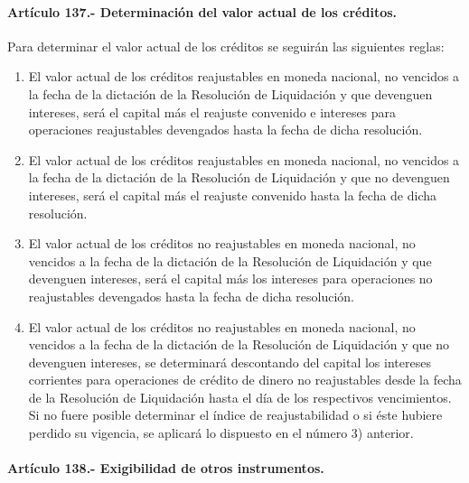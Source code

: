 \documentclass[
]{book}
\begin{document}
\hypertarget{artuxedculo-137.--determinaciuxf3n-del-valor-actual-de-los-cruxe9ditos.}{%
\paragraph*{Artículo 137.- Determinación del valor actual de los créditos.}\label{artuxedculo-137.--determinaciuxf3n-del-valor-actual-de-los-cruxe9ditos.}}

Para determinar el valor actual de los créditos se seguirán las siguientes reglas:

\begin{enumerate}
\def\labelenumi{\arabic{enumi})}
\item
  El valor actual de los créditos reajustables en moneda nacional, no vencidos a la fecha de la dictación de la Resolución de Liquidación y que devenguen intereses, será el capital más el reajuste convenido e intereses para operaciones reajustables devengados hasta la fecha de dicha resolución.
\item
  El valor actual de los créditos reajustables en moneda nacional, no vencidos a la fecha de la dictación de la Resolución de Liquidación y que no devenguen intereses, será el capital más el reajuste convenido hasta la fecha de dicha resolución.
\item
  El valor actual de los créditos no reajustables en moneda nacional, no vencidos a la fecha de la dictación de la Resolución de Liquidación y que devenguen intereses, será el capital más los intereses para operaciones no reajustables devengados hasta la fecha de dicha resolución.
\item
  El valor actual de los créditos no reajustables en moneda nacional, no vencidos a la fecha de la dictación de la Resolución de Liquidación y que no devenguen intereses, se determinará descontando del capital los intereses corrientes para operaciones de crédito de dinero no reajustables desde la fecha de la Resolución de Liquidación hasta el día de los respectivos vencimientos. Si no fuere posible determinar el índice de reajustabilidad o si éste hubiere perdido su vigencia, se aplicará lo dispuesto en el número 3) anterior.
\end{enumerate}

\hypertarget{artuxedculo-138.--exigibilidad-de-otros-instrumentos.}{%
\paragraph*{Artículo 138.- Exigibilidad de otros instrumentos.}\label{artuxedculo-138.--exigibilidad-de-otros-instrumentos.}}
\end{document}
